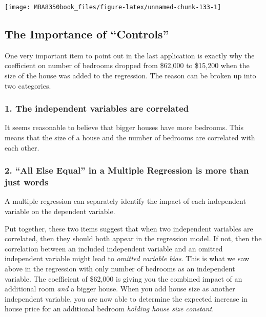 \documentclass[
]{book}
\begin{document}
\begin{center}\texttt{[image: MBA8350book\_files/figure-latex/unnamed-chunk-133-1]} \end{center}

\hypertarget{the-importance-of-controls}{%
\subsection{The Importance of ``Controls''}\label{the-importance-of-controls}}

One very important item to point out in the last application is exactly why the coefficient on number of bedrooms dropped from \$62,000 to \$15,200 when the size of the house was added to the regression. The reason can be broken up into two categories.

\hypertarget{the-independent-variables-are-correlated}{%
\subsubsection*{1. The independent variables are correlated}\label{the-independent-variables-are-correlated}}

It seems reasonable to believe that bigger houses have more bedrooms. This means that the size of a house and the number of bedrooms are correlated with each other.

\hypertarget{all-else-equal-in-a-multiple-regression-is-more-than-just-words}{%
\subsubsection*{2. ``All Else Equal'' in a Multiple Regression is more than just words}\label{all-else-equal-in-a-multiple-regression-is-more-than-just-words}}

A multiple regression can separately identify the impact of each independent variable on the dependent variable.

Put together, these two items suggest that when two independent variables are correlated, then they should both appear in the regression model. If not, then the correlation between an included independent variable and an omitted independent variable might lead to \emph{omitted variable bias}. This is what we saw above in the regression with only number of bedrooms as an independent variable. The coefficient of \$62,000 is giving you the combined impact of an additional room \emph{and} a bigger house. When you add house size as another independent variable, you are now able to determine the expected increase in house price for an additional bedroom \emph{holding house size constant}.
\end{document}

